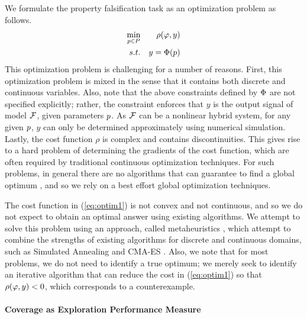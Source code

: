 We formulate the property falsification task as an optimization problem as follows.
\begin{eqnarray} \label{eq:optim1}
\min_{p \in P} && \rho(\varphi,y) \\ \nonumber
s.t. && y=\Phi(p)
\end{eqnarray}
This optimization problem is challenging for a number of reasons. First, this optimization problem is mixed in the sense that it contains both discrete and continuous variables. Also, note that the above constraints defined by $\Phi$ 
are not specified explicitly; rather, the constraint enforces that $y$ is the output signal of model $\mathcal{F}$, given parameters $p$.
As $\mathcal{F}$ can be a nonlinear hybrid system, for any given $p$, $y$ can only be determined approximately using numerical simulation. 
Lastly, the cost function $\rho$ is complex and contains discontinuities.
This gives rise to a hard problem of determining the gradients of the cost function, which are often required by traditional continuous optimization techniques. 
For such problems, in general there are no algorithms that can guarantee to find a global optimum \cite{FloudasPardalos2009}, and so we rely on a best effort global optimization techniques. 

The cost function in (\ref{eq:optim1}) is not convex and not continuous, and so we do not expect to obtain an optimal answer using existing algorithms. We attempt to solve this problem using an approach, called metaheuristics \cite{dreo:hal-01341683}, which attempt to combine the strengths of existing algorithms for discrete and continuous domains, such as Simulated Annealing \cite{Kirkpatrick83optimizationby} and CMA-ES \cite{hansen2006eda}. Also, we note that for most problems, we do not need to identify a true optimum; we merely seek to identify an iterative algorithm that can reduce the cost in (\ref{eq:optim1}) so that $\rho(\varphi,y)<0$, which corresponds to a counterexample.


\paragraph{Coverage as Exploration Performance Measure}	

